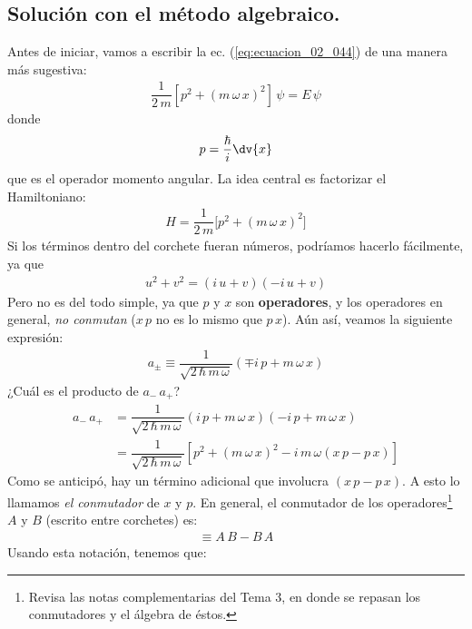 \subsection{Solución con el método algebraico.}
Antes de iniciar, vamos a escribir la ec. (\ref{eq:ecuacion_02_044}) de una manera más sugestiva:
\begin{align}
\dfrac{1}{2 \, m} \left[ p^{2} + (m \, \omega \, x)^{2} \right] \, \psi = E \, \psi
\label{eq:ecuacion_02_045}
\end{align}
donde
\begin{align*}
p = \dfrac{\hbar}{i} \dv{x}
\end{align*}
que es el operador momento angular. La idea central es factorizar el Hamiltoniano:
\begin{align}
H = \dfrac{1}{2 \, m} \big[ p^{2} + (m \, \omega \, x)^{2} \big]
\label{eq:ecuacion_02_046}
\end{align}
Si los términos dentro del corchete fueran números, podríamos hacerlo fácilmente, ya que
\begin{align*}
u^{2} + v^{2} = ( i \, u +  v)(- i \, u + v)
\end{align*}
Pero no es del todo simple, ya que $p$ y $x$ son \textbf{operadores}, y los operadores en general, \textit{no conmutan} ($x \, p$ no es lo mismo que $p \, x$). Aún así, veamos la siguiente expresión:
\begin{align}
a_{\pm} \equiv \dfrac{1}{\sqrt{2 \, \hbar \, m \, \omega }} \left( \mp i \, p + m \, \omega \, x \right)
\label{eq:ecuacion_02_047}
\end{align}
¿Cuál es el producto de $a_{-} \, a_{+}$?
\begin{align*}
a_{-} \, a_{+} &= \dfrac{1}{\sqrt{2 \, \hbar \, m \, \omega }} \left( i \, p + m \, \omega \, x \right) \left( - i \, p + m \, \omega \, x \right) \\[0.5em]
&= \dfrac{1}{\sqrt{2 \, \hbar \, m \, \omega }} \left[ p^{2} + (m \, \omega \, x)^{2} - i \, m \, \omega (x \, p - p \, x) \right]
\end{align*}
Como se anticipó, hay un término adicional que involucra $(x \, p - p \, x)$. A esto lo llamamos \emph{el conmutador} de $x$ y $p$. En general, el conmutador de los operadores\footnote{Revisa las notas complementarias del Tema 3, en donde se repasan los conmutadores y el álgebra de éstos.} $A$ y $B$ (escrito entre corchetes) es:
\begin{align}
[A, B] \equiv A \, B - B \, A
\label{eq:ecuacion_02_048}
\end{align}
Usando esta notación, tenemos que:
